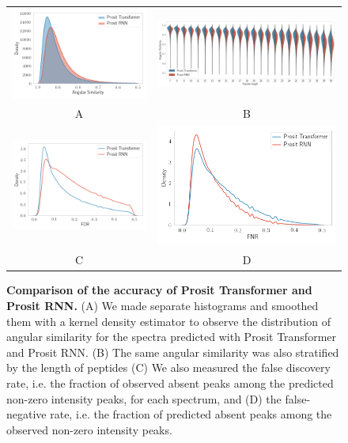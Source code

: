 \documentclass[10pt,a4paper]{article}
\begin{document}
\begin{figure}[htb]
\centering
\begin{tabular}{cc}
\includegraphics[width=6cm]{./img/spectralAngleDist.png} & \includegraphics[width=8cm]{./img/violin_sa_pepLen.png}\\
A & B \\
\includegraphics[width=6cm]{./img/fdr.png} & \includegraphics[width=6cm]{./img/fnr.png} \\
C & D 
\end{tabular}
\caption{{\bf Comparison of the accuracy of Prosit Transformer and Prosit RNN.} (A) We made separate histograms and smoothed them with a kernel density estimator to observe the distribution of angular similarity for the spectra predicted with Prosit Transformer and Prosit RNN. (B) The same angular similarity was also stratified by the length of peptides (C) We also measured the false discovery rate, i.e. the fraction of observed absent peaks among the predicted non-zero intensity peaks, for each spectrum, and (D) the false-negative rate, i.e. the fraction of predicted absent peaks among the observed non-zero intensity peaks.\label{fig:performance}}
\end{figure}
\end{document}
